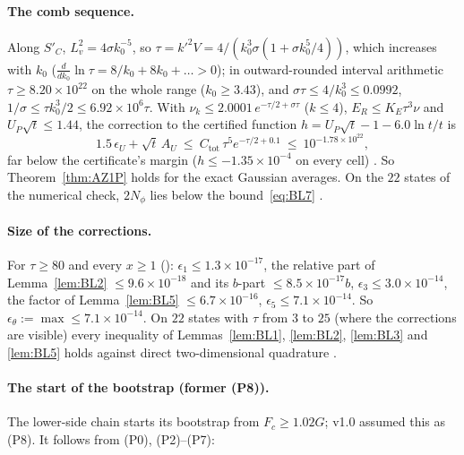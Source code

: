 \paragraph*{The comb sequence.} Along $S'_C$, $L_v^2=4\sigma k_0^{-5}$, so $\tau=k'^2V=4/(k_0^3\sigma(1+\sigma k_0^5/4))$, which increases with $k_0$
($\frac d{dk_0}\ln\tau=8/k_0+8k_0+\dots>0$); in outward-rounded interval arithmetic $\tau\ge8.20\times10^{22}$ on the whole range ($k_0\ge3.43$), and
$\sigma\tau\le4/k_0^3\le0.0992$, $1/\sigma\le\tau k_0^3/2\le6.92\times10^6\tau$. With $\nu_k\le2.0001\,e^{-\tau/2+\sigma\tau}$ ($k\le4$),
$E_R\le K_E\tau^3\nu$ and $U_P\sqrt t\le1.44$, the correction to the certified function $h=U_P\sqrt t-1-6.0\ln t/t$ is
\begin{equation}
1.5\,\epsilon_U+\sqrt t\,A_U\ \le\ C_{\mathrm{tot}}\,\tau^5e^{-\tau/2+0.1}\ \le\ 10^{-1.78\times10^{22}},
\end{equation}
far below the certificate's margin ($h\le-1.35\times10^{-4}$ on every cell) . So Theorem~\ref{thm:AZ1P} holds for the exact Gaussian
averages. On the $22$ states of the numerical check, $2N_\phi$ lies below the bound~\eqref{eq:BL7} \numst.

\paragraph*{Size of the corrections.} For $\tau\ge80$ and every $x\ge1$ ():
$\epsilon_1\le1.3\times10^{-17}$, the relative part of Lemma~\ref{lem:BL2} $\le9.6\times10^{-18}$ and its $b$-part $\le8.5\times10^{-17}b$,
$\epsilon_3\le3.0\times10^{-14}$, the factor of Lemma~\ref{lem:BL5} $\le6.7\times10^{-16}$, $\epsilon_5\le7.1\times10^{-14}$. So
$\epsilon_\theta:=\max\le7.1\times10^{-14}$. On $22$ states with $\tau$ from $3$ to $25$ (where the corrections are visible) every inequality of
Lemmas~\ref{lem:BL1}, \ref{lem:BL2}, \ref{lem:BL3} and \ref{lem:BL5} holds against direct two-dimensional quadrature \numst.

\paragraph*{The start of the bootstrap (former (P8)).}
The lower-side chain starts its bootstrap from $F_c\ge1.02G$; v1.0 assumed this as (P8). It follows from (P0), (P2)--(P7):

